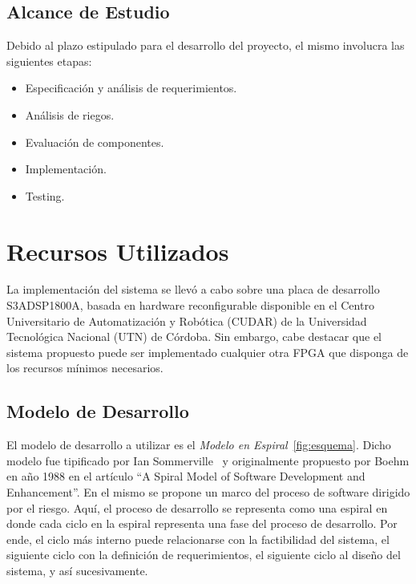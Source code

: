 \subsection{Alcance de Estudio}

Debido al plazo estipulado para el desarrollo del proyecto, el mismo
involucra las siguientes etapas:

\begin{itemize}
\item Especificación y análisis de requerimientos.
\item Análisis de riegos.
\item Evaluación de componentes.
\item Implementación.
\item Testing.
\end{itemize}

\section{Recursos Utilizados}

La implementación del sistema se llevó a cabo sobre una placa de
desarrollo S3ADSP1800A, basada en hardware reconfigurable disponible en
el Centro Universitario de Automatización y Robótica (CUDAR) de la
Universidad Tecnológica Nacional (UTN) de Córdoba. Sin embargo, cabe
destacar que el sistema propuesto puede ser implementado cualquier
otra FPGA que disponga de los recursos mínimos necesarios.



\subsection{Modelo de Desarrollo}
El modelo de desarrollo a utilizar es el \textit{Modelo en
  Espiral}~\ref{fig:esquema}. Dicho modelo fue tipificado por Ian
Sommerville~\cite{Etiqueta00} y originalmente propuesto por Boehm en
año 1988 en el artículo ``A Spiral Model of Software Development and
Enhancement''. En el mismo se propone un marco del proceso de software
dirigido por el riesgo. Aquí, el proceso de desarrollo se representa
como una espiral en donde cada ciclo en la espiral representa una fase
del proceso de desarrollo. Por ende, el ciclo más interno puede
relacionarse con la factibilidad del sistema, el siguiente ciclo con
la definición de requerimientos, el siguiente ciclo al diseño del
sistema, y así sucesivamente.

